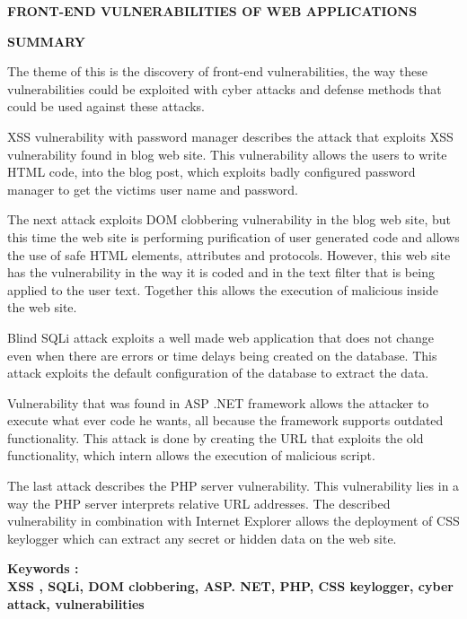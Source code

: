 

\newpage
\setlength{\parindent}{0in}

\begin{center}
	{\LARGE\bf{FRONT-END VULNERABILITIES OF WEB APPLICATIONS}}
\end{center}
\vskip 10mm

{\fontsize{14}{18}\bf {SUMMARY}}

\vskip 15mm
\textnormal{
The theme of this is the discovery of front-end vulnerabilities, the way these vulnerabilities could be exploited with cyber attacks and defense methods that could be used against these attacks.}

\textnormal{
XSS vulnerability with password manager describes the attack that exploits XSS vulnerability found in blog web site. This vulnerability allows the users to write HTML code, into the blog post, which exploits badly configured password manager to get the victims user name and password.}

\textnormal{
The next attack exploits DOM clobbering vulnerability in the blog web site, but this time the web site is performing purification of user generated code and allows the use of safe HTML elements, attributes and protocols. However, this web site has the vulnerability in the way it is coded and in the text filter that is being applied to the user text. Together this allows the execution of malicious inside the web site.}

\textnormal{
Blind SQLi attack exploits a well made web application that does not change even when there are errors or time delays being created on the database. This attack exploits the default configuration of the database to extract the data.}

\textnormal{
Vulnerability that was found in ASP .NET framework allows the attacker to execute what ever code he wants, all because the framework supports outdated functionality. This attack is done by creating the URL that exploits the old functionality, which intern allows the execution of malicious script.}

\textnormal{
The last attack describes the PHP server vulnerability. This vulnerability lies in a way the PHP server interprets relative URL addresses. The described vulnerability in combination with Internet Explorer allows the deployment of CSS keylogger which can extract any secret or hidden data on the web site.}

\bf{Keywords  :\\}
\textnormal{XSS , SQLi, DOM clobbering, ASP. NET, PHP, CSS keylogger, cyber attack, vulnerabilities}
